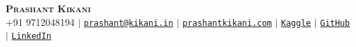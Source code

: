 \documentclass{resume}
\begin{document}
\begin{center}
    \textbf{\Huge \scshape Prashant Kikani} \\  \vspace{5pt}
     +91 9712048194 $|$
     \href{mailto:prashant@kikani.in}{\texttt{prashant@kikani.in}} $|$ 
     \href{https://prashantkikani.com}{\texttt{prashantkikani.com}} $|$
    \href{https://www.kaggle.com/prashantkikani}{\texttt{Kaggle}} $|$
    \href{https://github.com/prashant-kikani}{\texttt{GitHub}} $|$  
    \href{https://www.linkedin.com/in/prashant-kikani}{\texttt{LinkedIn}}
    
\end{center}


\vspace{3pt} 


\end{document}
